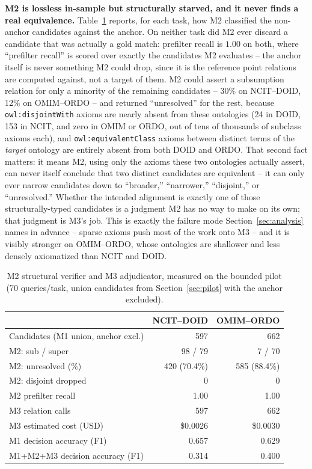 \documentclass[conference]{IEEEtran}
\begin{document}
\textbf{M2 is lossless in-sample but structurally starved, and it never finds a real equivalence.} Table~\ref{tab:m2m3} reports, for each task, how M2 classified the non-anchor candidates against the anchor. On neither task did M2 ever discard a candidate that was actually a gold match: prefilter recall is $1.00$ on both, where ``prefilter recall'' is scored over exactly the candidates M2 evaluates -- the anchor itself is never something M2 could drop, since it is the reference point relations are computed against, not a target of them. M2 could assert a subsumption relation for only a minority of the remaining candidates -- 30\% on NCIT--DOID, 12\% on OMIM--ORDO -- and returned ``unresolved'' for the rest, because \texttt{owl:disjointWith} axioms are nearly absent from these ontologies (24 in DOID, 153 in NCIT, and zero in OMIM or ORDO, out of tens of thousands of subclass axioms each), and \texttt{owl:equivalentClass} axioms between distinct terms of the \emph{target} ontology are entirely absent from both DOID and ORDO. That second fact matters: it means M2, using only the axioms these two ontologies actually assert, can never itself conclude that two distinct candidates are equivalent -- it can only ever narrow candidates down to ``broader,'' ``narrower,'' ``disjoint,'' or ``unresolved.'' Whether the intended alignment is exactly one of those structurally-typed candidates is a judgment M2 has no way to make on its own; that judgment is M3's job. This is exactly the failure mode Section~\ref{sec:analysis} names in advance -- sparse axioms push most of the work onto M3 -- and it is visibly stronger on OMIM--ORDO, whose ontologies are shallower and less densely axiomatized than NCIT and DOID.

\begin{table}[t]
\caption{M2 structural verifier and M3 adjudicator, measured on the bounded pilot (70 queries/task, union candidates from Section~\ref{sec:pilot} with the anchor excluded).}
\label{tab:m2m3}
\centering
\footnotesize
\begin{tabular}{@{}lrr@{}}
\toprule
 & \textbf{NCIT--DOID} & \textbf{OMIM--ORDO} \\
\midrule
Candidates (M1 union, anchor excl.) & 597 & 662 \\
M2: sub / super & 98 / 79 & 7 / 70 \\
M2: unresolved (\%) & 420 (70.4\%) & 585 (88.4\%) \\
M2: disjoint dropped & 0 & 0 \\
M2 prefilter recall & 1.00 & 1.00 \\
M3 relation calls & 597 & 662 \\
M3 estimated cost (USD) & \$0.0026 & \$0.0030 \\
M1 decision accuracy (F1) & 0.657 & 0.629 \\
M1+M2+M3 decision accuracy (F1) & 0.314 & 0.400 \\
\bottomrule
\end{tabular}
\end{table}
\end{document}
